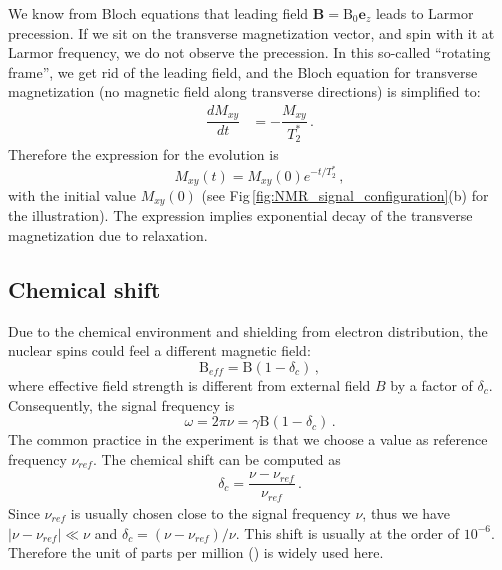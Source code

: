 We know from Bloch equations that leading field $\mathbf{B} = \mathrm{B}_0 \mathbf{e}_z$ leads to Larmor precession. If we sit on the transverse magnetization vector, and spin with it at Larmor frequency, we do not observe the precession. In this so-called ``rotating frame'', we get rid of the leading field, and the Bloch equation for transverse magnetization (no magnetic field along transverse directions) is simplified to:
\begin{align}
    \dfrac{d M_{xy}}{dt} &= - \dfrac{ M_{xy} }{T_2^*}\,.
\end{align}
Therefore the expression for the evolution is
\begin{equation}\label{eq:T_2relaxation}
    M_{xy}(t) = M_{xy}(0) e^{- t/T_2^*}\,,
\end{equation}
with the initial value $M_{xy}(0)$ (see Fig\,\ref{fig:NMR_signal_configuration}(b) for the illustration). The expression implies exponential decay of the transverse magnetization due to relaxation. 



\subsection{Chemical shift}

Due to the chemical environment and shielding from electron distribution, the nuclear spins could feel a different magnetic field:
\begin{equation}\label{eq:chemicalshiftfield}
    \mathrm{B}_{eff} = \mathrm{B} (1-\delta_c)\,,
\end{equation}
where effective field strength is different from external field $B$ by a factor of $\delta_c$. Consequently, the signal frequency is
\begin{equation}
    \omega = 2 \pi \nu = \gamma \mathrm{B}(1-\delta_c)\,. \label{eq:omega_gamma_B_chemicalshift}
\end{equation}
The common practice in the experiment is that we choose a value as reference frequency $\nu_{ref}$. The chemical shift can be computed as
\begin{align}
    \delta_c = \dfrac{\nu - \nu_{ref}}{\nu_{ref}}\,.
\end{align}
Since $\nu_{ref}$ is usually chosen close to the signal frequency $\nu$, thus we have $|\nu - \nu_{ref}| \ll \nu$ and $\delta_c = (\nu - \nu_{ref})/\nu$. This shift is usually at the order of $10^{-6}$. Therefore the unit of parts per million (\SI{}{\ppm}) is widely used here. 

